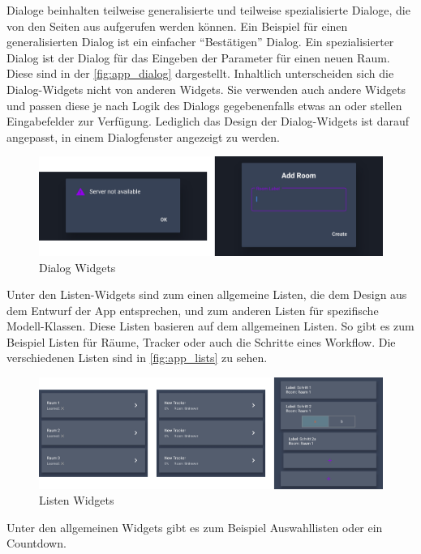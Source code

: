 Dialoge beinhalten teilweise generalisierte und teilweise spezialisierte Dialoge, die von den Seiten aus aufgerufen werden können.
Ein Beispiel für einen generalisierten Dialog ist ein einfacher \enquote{Bestätigen} Dialog.
Ein spezialisierter Dialog ist der Dialog für das Eingeben der Parameter für einen neuen Raum.
Diese sind in der \autoref{fig:app_dialog} dargestellt.
Inhaltlich unterscheiden sich die Dialog-Widgets nicht von anderen Widgets.
Sie verwenden auch andere Widgets und passen diese je nach Logik des Dialogs gegebenenfalls etwas an oder stellen
Eingabefelder zur Verfügung.
Lediglich das Design der Dialog-Widgets ist darauf angepasst, in einem Dialogfenster angezeigt zu werden.

\begin{figure}[htbp]
	\includegraphics[width=\textwidth]{images/app_dialog.png}
	\centering
	\caption{Dialog Widgets}
	\label{fig:app_dialog}
\end{figure}

Unter den Listen-Widgets sind zum einen allgemeine Listen, die dem Design aus dem Entwurf der App entsprechen, und zum
anderen Listen für spezifische Modell-Klassen.
Diese Listen basieren auf dem allgemeinen Listen.
So gibt es zum Beispiel Listen für Räume, Tracker oder auch die Schritte eines Workflow.
Die verschiedenen Listen sind in \autoref{fig:app_lists} zu sehen.

\begin{figure}[htbp]
	\includegraphics[width=\textwidth]{images/app_lists.png}
	\centering
	\caption{Listen Widgets}
	\label{fig:app_lists}
\end{figure}

Unter den allgemeinen Widgets gibt es zum Beispiel Auswahllisten oder ein Countdown.

